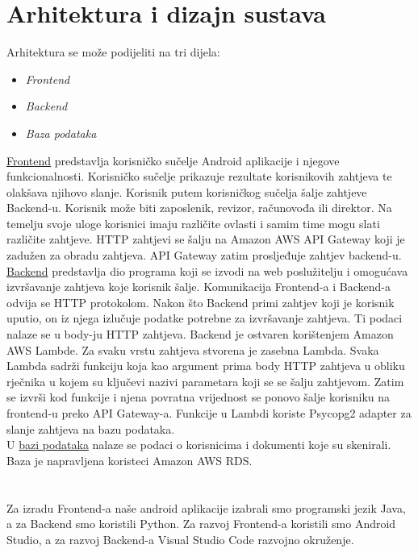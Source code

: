 
\chapter{Arhitektura i dizajn sustava}
		 Arhitektura se može podijeliti na tri dijela:
	\begin{itemize}
		\item 	\textit{Frontend}
		\item 	\textit{Backend}
		\item 	\textit{Baza podataka}		
	\end{itemize}
		
		\underline{Frontend} predstavlja korisničko sučelje Android aplikacije i njegove funkcionalnosti. Korisničko sučelje prikazuje rezultate korisnikovih zahtjeva te olakšava njihovo slanje. Korisnik putem korisničkog sučelja šalje zahtjeve Backend-u. Korisnik može biti zaposlenik, revizor, računovođa ili direktor. Na temelju svoje uloge korisnici imaju različite ovlasti i samim time mogu slati različite zahtjeve.
		HTTP zahtjevi se šalju na Amazon AWS API Gateway koji je zadužen za obradu zahtjeva. API Gateway zatim prosljeđuje zahtjev backend-u.\\
		
		\underline{Backend} predstavlja dio programa koji se izvodi na web poslužitelju i omogućava izvršavanje zahtjeva koje korisnik šalje. Komunikacija Frontend-a i Backend-a odvija se HTTP protokolom. Nakon što Backend primi zahtjev koji je korisnik uputio, on iz njega izlučuje podatke potrebne za izvršavanje zahtjeva. Ti podaci nalaze se u body-ju HTTP zahtjeva. Backend je ostvaren korištenjem Amazon AWS Lambde. Za svaku vrstu zahtjeva stvorena je zasebna Lambda. Svaka Lambda sadrži funkciju koja kao argument prima body HTTP zahtjeva u obliku rječnika u kojem su ključevi nazivi parametara koji se se šalju zahtjevom. Zatim se izvrši kod funkcije i njena povratna vrijednost se ponovo šalje korisniku na frontend-u preko API Gateway-a. Funkcije u Lambdi koriste Psycopg2 adapter za slanje zahtjeva na bazu podataka. \\
		
		U \underline{bazi podataka} nalaze se podaci o korisnicima i dokumenti koje su skenirali. Baza je napravljena koristeci Amazon AWS RDS.\\\\\\
		
		Za izradu Frontend-a naše android aplikacije izabrali smo programski jezik Java, a za Backend smo koristili Python. Za razvoj Frontend-a koristili smo Android Studio, a za razvoj Backend-a Visual Studio Code razvojno okruženje.\\
	
